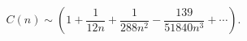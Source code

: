 \begin{equation*}
 C(n)\sim\left(1+\frac{1}{12n}
 +\frac{1}{288n^2}
 -\frac{139}{51840n^3}
 +\cdots\right).
\end{equation*}
